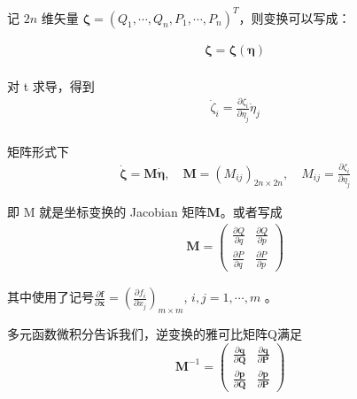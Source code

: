 \documentclass[12pt]{ctexart}
\begin{document}
记 $2n$ 维矢量 $\boldsymbol{\zeta}=(Q_1,\cdots,Q_n,P_1,\cdots,P_n)^T$，则变换可以写成：

\begin{equation}
\begin{aligned}
&\boldsymbol{\zeta} = \boldsymbol{\zeta}(\boldsymbol{\eta}) \\
\end{aligned}
\label{eq:8}
\end{equation}

对 t 求导，得到
\begin{equation}
    \begin{aligned}
&\dot{\zeta}_{i} = \frac{\partial \zeta_{i}}{\partial \eta_{j}} \dot{\eta}_{j} \\
\end{aligned}
\label{eq:9}
\end{equation}

矩阵形式下
\begin{equation}
    \begin{aligned}
&\dot{\boldsymbol{\zeta}} = \boldsymbol{M} \dot{\boldsymbol{\eta}}, \quad \boldsymbol{M}=(M_{ij})_{2n\times 2n}, \quad M_{ij} = \frac{\partial \zeta_i}{\partial \eta_j} 
\end{aligned}
\label{eq:10}
\end{equation}

即 M 就是坐标变换的 Jacobian 矩阵$\boldsymbol{M}$。或者写成 
\begin{equation}
    \begin{aligned}
&\boldsymbol{M} = \begin{pmatrix}\frac{\partial Q}{\partial q} & \frac{\partial Q}{\partial p}\\ \frac{\partial P}{\partial q} & \frac{\partial P}{\partial p}\end{pmatrix}
\end{aligned}
\label{eq:11}
\end{equation}


其中使用了记号$\frac {\partial \boldsymbol{f}}{\partial \boldsymbol{x}}= \left ( \frac {\partial f_i}{\partial x_j}\right ) _{m\times m}$, $i, j= 1, \cdots , m$ 。

多元函数微积分告诉我们，逆变换的雅可比矩阵Q满足
\begin{equation}
    \boldsymbol{M}^{-1}=\begin{pmatrix}\frac{\partial\boldsymbol{q}}{\partial\boldsymbol{Q}}&\frac{\partial\boldsymbol{q}}{\partial\boldsymbol{P}}\\\frac{\partial\boldsymbol{p}}{\partial\boldsymbol{Q}}&\frac{\partial\boldsymbol{p}}{\partial\boldsymbol{P}}\end{pmatrix}
    \label{eq:12}
\end{equation}
\end{document}
